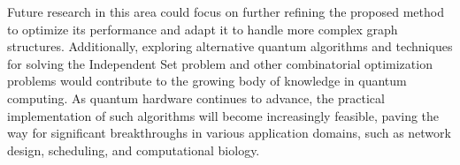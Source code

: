 Future research in this area could focus on further refining the proposed method to optimize its performance and adapt it to handle more complex graph structures. Additionally, exploring alternative quantum algorithms and techniques for solving the Independent Set problem and other combinatorial optimization problems would contribute to the growing body of knowledge in quantum computing. As quantum hardware continues to advance, the practical implementation of such algorithms will become increasingly feasible, paving the way for significant breakthroughs in various application domains, such as network design, scheduling, and computational biology.

